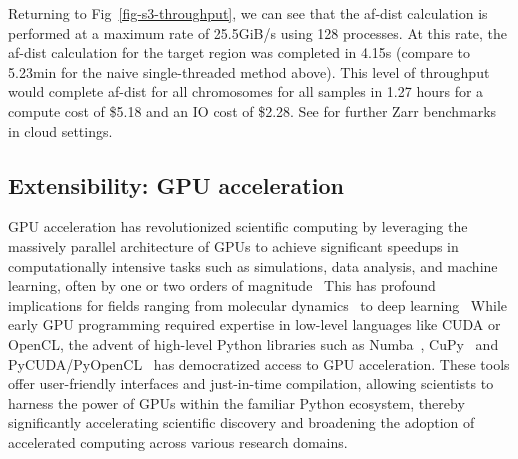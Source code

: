 \documentclass[a4paper,num-refs]{oup-contemporary}
\begin{document}
Returning to Fig~\ref{fig-s3-throughput}, we can see that the af-dist
calculation is performed at a maximum rate of 25.5GiB/s using 128
processes. At this rate, the af-dist calculation for the target region
was completed in 4.15s (compare to 5.23min for the naive single-threaded
method above).
This level of throughput would complete af-dist for all chromosomes for all samples
in 1.27 hours for a compute cost of \$5.18 and an IO cost of \$2.28.
See \citep{durbin2020task,moore2021ome,gowan2022using} for further Zarr
benchmarks in cloud settings.

\subsection{Extensibility: GPU acceleration}
GPU acceleration has revolutionized scientific computing by leveraging the
massively parallel architecture of GPUs to achieve significant speedups in
computationally intensive tasks such as simulations, data analysis, and machine
learning, often by one or two orders of magnitude~\citep{nickolls2010gpu,
mittal2014survey,owens2008gpu}
This has profound implications for
fields ranging from molecular dynamics~\citep{stone2007accelerating}
to deep learning~\citep{lecun2015deep}
While early GPU programming required expertise in
low-level languages like CUDA or OpenCL, the advent of high-level Python
libraries such as Numba~\citep{lam2015numba}, CuPy~\citep{okuta2017cupy} 
and
PyCUDA/PyOpenCL~\citep{klockner2012pycuda}
has democratized access to GPU acceleration.
These tools offer user-friendly interfaces and just-in-time compilation,
allowing scientists to harness the power of GPUs within the familiar Python
ecosystem, thereby significantly accelerating scientific discovery and
broadening the adoption of accelerated computing across various research
domains.

\end{document}
